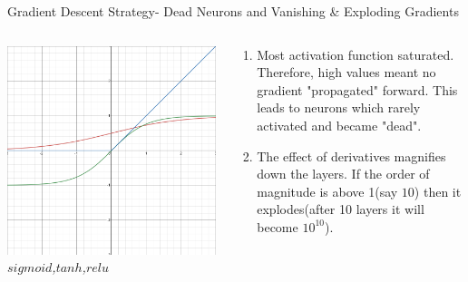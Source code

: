 \begin{frame}{Gradient Descent Strategy- Dead Neurons and Vanishing \& Exploding Gradients}
	\begin{columns}[T]
        \begin{column}{0.5\textwidth}
        	\includegraphics[width=\textwidth]{images/relu.png}
        	\tiny{\textit{$sigmoid$,$tanh$,$relu$}}
        \end{column}
	    \begin{column}{0.5\textwidth}
    	    \begin{enumerate}[$\bullet$]
				\item Most activation function saturated. Therefore, high values meant no gradient "propagated" forward. This leads to neurons which rarely activated and became "dead".\pause 
				\item The effect of derivatives magnifies down the layers. If the order of magnitude is above 1(say $10$) then it explodes(after 10 layers it will become $10^{10}$).
			\end{enumerate}
    	\end{column}
    \end{columns}
\end{frame}

